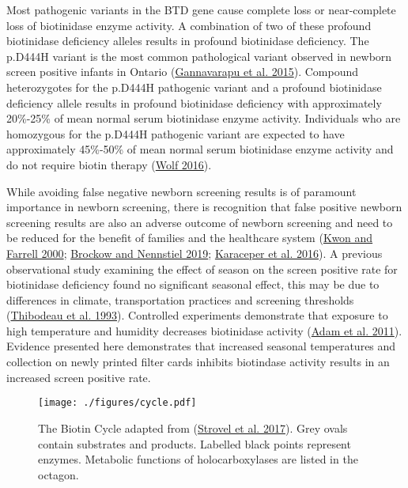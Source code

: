 \documentclass[review]{elsarticle}
\begin{document}
Most pathogenic variants in the BTD gene cause complete loss or
near-complete loss of biotinidase enzyme activity. A combination of
two of these profound biotinidase deficiency alleles results in
profound biotinidase deficiency. The p.D444H variant is the most
common pathological variant observed in newborn screen positive
infants in Ontario (\hyperlink{citeproc_bib_item_5}{Gannavarapu et al. 2015}). Compound heterozygotes for
the p.D444H pathogenic variant and a profound biotinidase deficiency
allele results in profound biotinidase deficiency with approximately
20\%-25\% of mean normal serum biotinidase enzyme activity. Individuals
who are homozygous for the p.D444H pathogenic variant are expected to
have approximately 45\%-50\% of mean normal serum biotinidase enzyme
activity and do not require biotin therapy (\hyperlink{citeproc_bib_item_16}{Wolf 2016}).

While avoiding false negative newborn screening results is of
paramount importance in newborn screening, there is recognition that
false positive newborn screening results are also an adverse outcome
of newborn screening and need to be reduced for the benefit of
families and the healthcare system (\hyperlink{citeproc_bib_item_7}{Kwon and Farrell 2000}; \hyperlink{citeproc_bib_item_2}{Brockow and Nennstiel 2019}; \hyperlink{citeproc_bib_item_6}{Karaceper et al. 2016}). A previous observational
study examining the effect of season on the screen positive rate for
biotinidase deficiency found no significant seasonal effect, this may
be due to differences in climate, transportation practices and
screening thresholds (\hyperlink{citeproc_bib_item_12}{Thibodeau et al. 1993}). Controlled experiments
demonstrate that exposure to high temperature and humidity decreases
biotinidase activity (\hyperlink{citeproc_bib_item_1}{Adam et al. 2011}). Evidence presented here
demonstrates that increased seasonal temperatures and collection on
newly printed filter cards inhibits biotindase activity results in an
increased screen positive rate.



\begin{figure}[htbp]
\centering
\texttt{[image: ./figures/cycle.pdf]}
\caption{\label{fig:orge7e7833}The Biotin Cycle adapted from (\hyperlink{citeproc_bib_item_10}{Strovel et al. 2017}). Grey ovals contain substrates and products. Labelled black points represent enzymes. Metabolic functions of holocarboxylases are listed in the octagon.}
\end{figure}
\end{document}
